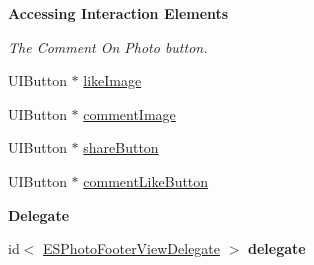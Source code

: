 \begin{Indent}{\bf Accessing Interaction Elements}
\begin{DoxyCompactItemize}
\begin{DoxyCompactList}\small\item\em The Comment On Photo button. \end{DoxyCompactList}\item 
U\+I\+Button $\ast$ \hyperlink{interface_e_s_photo_footer_view_a0b3d99a66a63e279fd4c4bd2ce4e6dbe}{like\+Image}
\item 
U\+I\+Button $\ast$ \hyperlink{interface_e_s_photo_footer_view_a83d19dc41770a036cd4f501f47bcb1b7}{comment\+Image}
\item 
U\+I\+Button $\ast$ \hyperlink{interface_e_s_photo_footer_view_af521914fcde41e29e0c77020a8d3682a}{share\+Button}
\item 
U\+I\+Button $\ast$ \hyperlink{interface_e_s_photo_footer_view_a7aafde82a43dda000261a50d8b4e5a5d}{comment\+Like\+Button}
\end{DoxyCompactItemize}
\end{Indent}
\begin{Indent}{\bf Delegate}\par
\begin{DoxyCompactItemize}
\item 
\hypertarget{interface_e_s_photo_footer_view_a0d58fe6311da760d765dde75a0a7b637}{}id$<$ \hyperlink{protocol_e_s_photo_footer_view_delegate-p}{E\+S\+Photo\+Footer\+View\+Delegate} $>$ {\bfseries delegate}\label{interface_e_s_photo_footer_view_a0d58fe6311da760d765dde75a0a7b637}

\end{DoxyCompactItemize}
\end{Indent}
